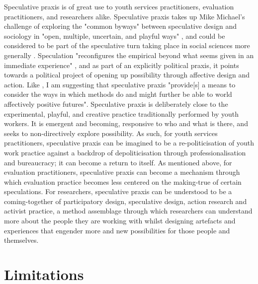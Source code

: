 Speculative praxis is of great use to youth services practitioners, evaluation practitioners, and researchers alike. Speculative praxis takes up Mike Michael's challenge of exploring the "common byways" between speculative design and sociology in "open, multiple, uncertain, and playful ways" \citep[p. 177]{michael_-signing_2012}, and could be considered to be part of the speculative turn taking place in social sciences more generally \citep[p. 1]{williams_abstract_2022}.  Speculation "reconfigures the empirical beyond what seems given in an immediate experience" \citep[p. 2]{williams_abstract_2022}, and as part of an explicitly political praxis, it points towards a political project of opening up possibility through affective design and action. Like \citep[p. 55]{coleman_glitterworlds_2020}, I am suggesting that speculative praxis "provide[s] a means to consider the ways in which methods do and might further be able to world affectively positive futures". Speculative praxis is deliberately close to the experimental, playful, and creative practice traditionally performed by youth workers. It is emergent and becoming, responsive to who and what is there, and seeks to non-directively explore possibility. As such, for youth services practitioners, speculative praxis can be imagined to be a re-politicisation of youth work practice against a backdrop of depoliticisation through professionalisation and bureaucracy; it can become a return to itself. As mentioned above, for evaluation practitioners, speculative praxis can become a mechanism through which evaluation practice becomes less centered on the making-true of certain speculations. For researchers, speculative praxis can be understood to be a coming-together of participatory design, speculative design, action research and activist practice, a method assemblage through which researchers can understand more about the people they are working with whilst designing artefacts and experiences that engender more and new possibilities for those people and themselves.

\section{Limitations}

